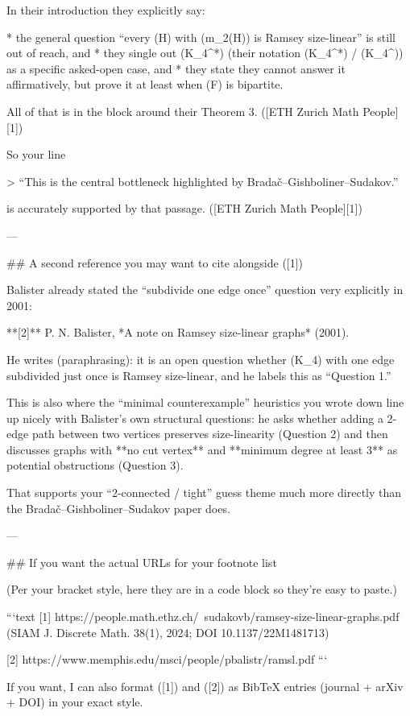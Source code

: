 In their introduction they explicitly say:

* the general question “every (H) with (m_2(H)) is Ramsey size-linear” is still out of reach, and
* they single out (K_4^*) (their notation (K_4^*) / (K_4^\ast)) as a specific asked-open case, and
* they state they cannot answer it affirmatively, but prove it at least when (F) is bipartite.

All of that is in the block around their Theorem 3. ([ETH Zurich Math People][1])

So your line

> “This is the central bottleneck highlighted by Bradač–Gishboliner–Sudakov.”

is accurately supported by that passage. ([ETH Zurich Math People][1])

---

## A second reference you may want to cite alongside ([1])

Balister already stated the “subdivide one edge once” question very explicitly in 2001:

**[2]** P. N. Balister, *A note on Ramsey size-linear graphs* (2001). 

He writes (paraphrasing): it is an open question whether (K_4) with one edge subdivided just once is Ramsey size-linear, and he labels this as “Question 1.” 

This is also where the “minimal counterexample” heuristics you wrote down line up nicely with Balister’s own structural questions: he asks whether adding a 2-edge path between two vertices preserves size-linearity (Question 2) and then discusses graphs with **no cut vertex** and **minimum degree at least 3** as potential obstructions (Question 3). 

That supports your “2-connected / tight” guess theme much more directly than the Bradač–Gishboliner–Sudakov paper does.

---

## If you want the actual URLs for your footnote list

(Per your bracket style, here they are in a code block so they’re easy to paste.)

```text
[1] https://people.math.ethz.ch/~sudakovb/ramsey-size-linear-graphs.pdf
    (SIAM J. Discrete Math. 38(1), 2024; DOI 10.1137/22M1481713)

[2] https://www.memphis.edu/msci/people/pbalistr/ramsl.pdf
```

If you want, I can also format ([1]) and ([2]) as BibTeX entries (journal + arXiv + DOI) in your exact style.

